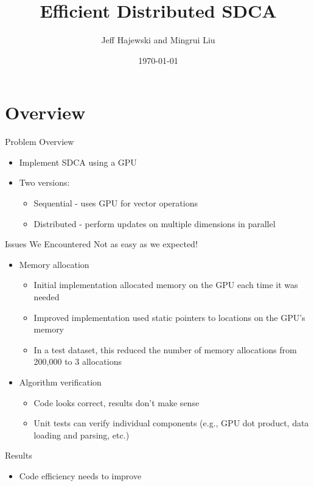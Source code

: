 \documentclass{beamer}
\title{Efficient Distributed SDCA}
\author{Jeff Hajewski and Mingrui Liu}
\date{\today}
\institute{University of Iowa}
\begin{document}
\maketitle
\section{Overview}
\begin{frame}{Problem Overview}
    \begin{itemize}
        \item Implement SDCA using a GPU
        \item Two versions:
            \begin{itemize}
                \item Sequential - uses GPU for vector operations
                \item Distributed - perform updates on multiple dimensions in
                    parallel
            \end{itemize}
    \end{itemize}

\end{frame}

\begin{frame}{Issues We Encountered}
    Not as easy as we expected!
    \begin{itemize}
        \item Memory allocation
            \begin{itemize}
                \item Initial implementation allocated memory on the GPU each
                    time it was needed
                \item Improved implementation used static pointers to locations
                    on the GPU's memory
                \item In a test dataset, this reduced the number of memory
                    allocations from 200,000 to 3 allocations
            \end{itemize}
        \item Algorithm verification
            \begin{itemize}
                \item Code looks correct, results don't make sense
                \item Unit tests can verify individual components (e.g., GPU
                    dot product, data loading and parsing, etc.)
            \end{itemize}
    \end{itemize}
\end{frame}

\begin{frame}{Results}
    \begin{itemize}
        \item Code efficiency needs to improve
    \end{itemize}
\end{frame}
\end{document}
